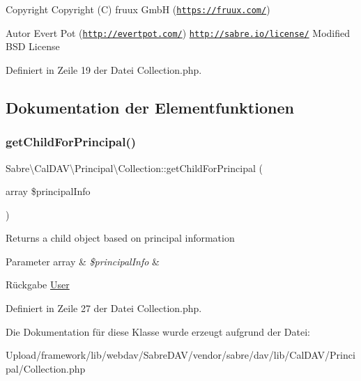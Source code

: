 \begin{DoxyCopyright}{Copyright}
Copyright (C) fruux GmbH (\href{https://fruux.com/}{\tt https\+://fruux.\+com/}) 
\end{DoxyCopyright}
\begin{DoxyAuthor}{Autor}
Evert Pot (\href{http://evertpot.com/}{\tt http\+://evertpot.\+com/})  \href{http://sabre.io/license/}{\tt http\+://sabre.\+io/license/} Modified B\+SD License 
\end{DoxyAuthor}


Definiert in Zeile 19 der Datei Collection.\+php.



\subsection{Dokumentation der Elementfunktionen}
\mbox{\label{class_sabre_1_1_cal_d_a_v_1_1_principal_1_1_collection_a1f164ea204f072db4c8b421ffa3f33df}} 
\subsubsection{\texorpdfstring{get\+Child\+For\+Principal()}{getChildForPrincipal()}}
{\footnotesize\ttfamily Sabre\textbackslash{}\+Cal\+D\+A\+V\textbackslash{}\+Principal\textbackslash{}\+Collection\+::get\+Child\+For\+Principal (\begin{DoxyParamCaption}\item[{array}]{\$principal\+Info }\end{DoxyParamCaption})}

Returns a child object based on principal information


\begin{DoxyParams}[1]{Parameter}
array & {\em \$principal\+Info} & \\
\hline
\end{DoxyParams}
\begin{DoxyReturn}{Rückgabe}
\mbox{\hyperlink{class_sabre_1_1_cal_d_a_v_1_1_principal_1_1_user}{User}} 
\end{DoxyReturn}


Definiert in Zeile 27 der Datei Collection.\+php.



Die Dokumentation für diese Klasse wurde erzeugt aufgrund der Datei\+:\begin{DoxyCompactItemize}
\item 
Upload/framework/lib/webdav/\+Sabre\+D\+A\+V/vendor/sabre/dav/lib/\+Cal\+D\+A\+V/\+Principal/Collection.\+php\end{DoxyCompactItemize}
